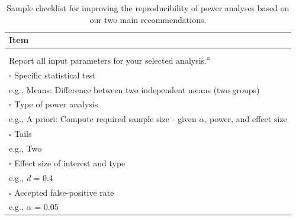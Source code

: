 \documentclass[
  man, donotrepeattitle,mask,floatsintext]{apa7}
\begin{document}
\begin{table}

\caption{\label{tab:table1}Sample checklist for improving the reproducibility of power analyses based on our two main recommendations.}
\fontsize{10}{12}\selectfont
\begin{threeparttable}
\begin{tabular}[t]{l}
\toprule
Item\\
\midrule
\addlinespace[0.3em]
\multicolumn{1}{l}{\textbf{Reporting practices}}\\
\hspace{1em}\hspace{-1em}Report all input parameters for your selected analysis.\textsuperscript{a}\\
\hspace{1em}$\square$ Specific statistical test \vspace{-1ex}\\
\hspace{1em}\hspace{2em} e.g., Means: Difference between two independent means (two groups)\\
\hspace{1em}$\square$ Type of power analysis \vspace{-1ex}\\
\hspace{1em}\hspace{2em} e.g., A priori: Compute required sample size - given $\alpha$, power, and effect size\\
\hspace{1em}$\square$ Tails \vspace{-1ex}\\
\hspace{1em}\hspace{2em} e.g., Two\\
\hspace{1em}$\square$ Effect size of interest and type \vspace{-1ex}\\
\hspace{1em}\hspace{2em} e.g., \emph{d} = 0.4\\
\hspace{1em}$\square$ Accepted false-positive rate \vspace{-1ex}\\
\hspace{1em}\hspace{2em} e.g., $\alpha$ = 0.05\\

\end{tabular}
\end{threeparttable}
\end{table}
\end{document}

